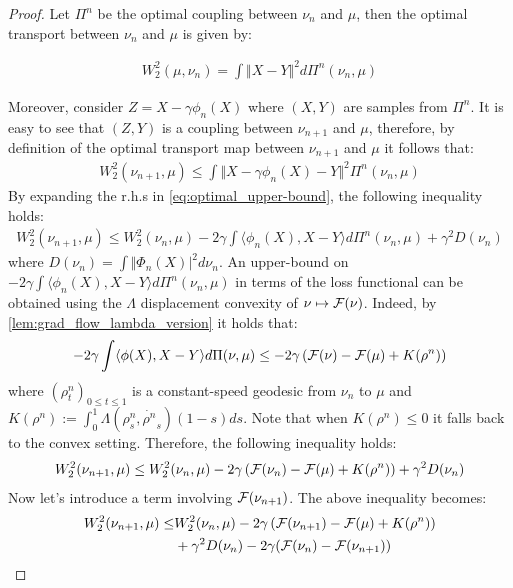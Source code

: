 \begin{proof}
Let $\Pi^n$ be the optimal coupling between $\nu_n$ and $\mu$, then the optimal transport between $\nu_n$ and $\mu$ is given by:

\begin{align}
	W_2^2(\mu,\nu_n)=\int \Vert X-Y \Vert^2 d\Pi^n(\nu_n,\mu)
\end{align}

Moreover, consider $Z=X-\gamma \phi_n(X)$ where $(X,Y)$ are samples from $\Pi^n$. It is easy to see that $(Z,Y)$ is a coupling between $\nu_{n+1}$ and $\mu$, therefore, by definition of the optimal transport map between $\nu_{n+1}$ and $\mu$ it follows that:
\begin{align}\label{eq:optimal_upper-bound}
	W_2^2(\nu_{n+1},\mu)\leq \int \Vert X-\gamma \phi_{n}(X)-Y\Vert^2 \Pi^n(\nu_n,\mu)
\end{align}
By expanding the r.h.s in \cref{eq:optimal_upper-bound}, the following inequality holds:
\begin{align}\label{eq:main_inequality}
	W_2^2(\nu_{n+1},\mu)\leq W_2^2(\nu_{n},\mu) -2\gamma \int \langle \phi_n(X), X-Y \rangle d\Pi^n(\nu_n,\mu)+ \gamma^2D(\nu_n)
\end{align}
where $D(\nu_n) = \int \Vert \Phi_n(X)\vert^2 d\nu_n $.
An upper-bound on $-2\gamma \int \langle \phi_n(X), X-Y \rangle d\Pi^n(\nu_n,\mu) $ in terms of the loss functional can be obtained using the $\Lambda$ displacement convexity of $\nu\mapsto {{\mathcal F}}(\nu)$. Indeed, by \cref{lem:grad_flow_lambda_version} it holds that:
\begin{align}\label{eq:flow_upper-bound}
	-2\gamma \int \langle \phi(X),X-Y \rangle d\Pi(\nu,\mu)
	\leq
	-2\gamma\left({{\mathcal F}}(\nu)- {{\mathcal F}}(\mu) +K(\rho^n)\right)
\end{align}
where $(\rho^n_t)_{0\leq t \leq 1}$ is a constant-speed geodesic from $\nu_n$ to $\mu$ and $K(\rho^n):=\int_0^1 \Lambda(\rho^n_s,\dot{\rho^n}_s)(1-s)ds$. Note that when $K(\rho^n)\leq 0$ it falls back to the convex setting.
Therefore, the following inequality holds:
\begin{align}
	W_2^2(\nu_{n+1},\mu)\leq W_2^2(\nu_{n},\mu) - 2\gamma\left({{\mathcal F}}(\nu_n)- {{\mathcal F}}(\mu) +K(\rho^n)\right) +\gamma^2 D(\nu_n)
\end{align}
Now let's introduce a term involving ${{\mathcal F}}(\nu_{n+1})$. The above inequality becomes:
\begin{align}
	W_2^2(\nu_{n+1},\mu)\leq & W_2^2(\nu_{n},\mu) - 2\gamma\left({{\mathcal F}}(\nu_{n+1})- {{\mathcal F}}(\mu) +K(\rho^n)\right) \\
		&+\gamma^2 D(\nu_n) -2\gamma ({{\mathcal F}}(\nu_n)-{{\mathcal F}}(\nu_{n+1}))
	\label{eq:main_ineq_2}
\end{align}
 

\end{proof}
